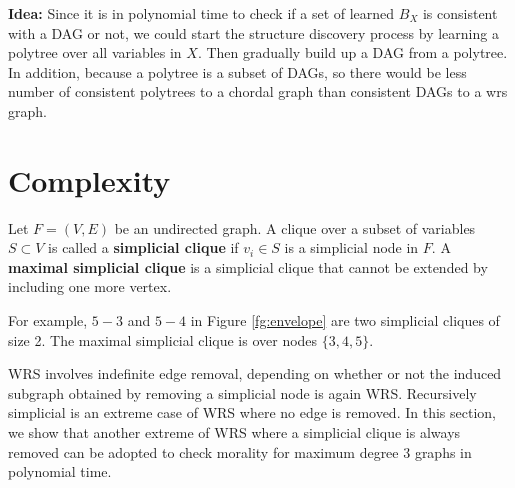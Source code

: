 \textbf{Idea:} Since it is in polynomial time to check if a set of learned $B_X$ is consistent with a DAG or not, we could start the structure discovery process by learning a polytree over all variables in $X$. Then gradually build up a DAG from a polytree. In addition, because a polytree is a subset of DAGs, so there would be less number of consistent polytrees to a chordal graph than consistent DAGs to a wrs graph.  

\section{Complexity}
\begin{definition}
Let $F=(V,E)$ be an undirected graph. A clique over a subset of variables $S \subset V$ is called a \textbf{simplicial clique} if $v_i \in S$ is a simplicial node in $F$. A \textbf{maximal simplicial clique} is a simplicial clique that cannot be extended by including one more vertex. 
\end{definition}
For example, $5-3$ and $5-4$ in Figure \ref{fg:envelope} are two simplicial cliques of size 2. The maximal simplicial clique is over nodes $\{3,4,5\}$.

WRS involves indefinite edge removal, depending on whether or not the induced subgraph obtained by removing a simplicial node is again WRS. Recursively simplicial is an extreme case of WRS where no edge is removed. In this section, we show that another extreme of WRS where a simplicial clique is always removed can be adopted to check morality for maximum degree $3$ graphs in polynomial time. 

